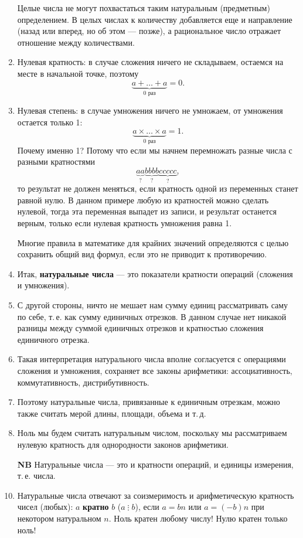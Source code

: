 \begin{enumerate}
Целые числа не могут похвастаться таким натуральным (предметным) определением. В целых числах к количеству добавляется еще и направление (назад или вперед, но об этом --- позже), а рациональное число отражает отношение между количествами.

\item Нулевая кратность: в случае сложения ничего не складываем, остаемся на месте в начальной точке, поэтому
$$
\underbrace{a+\dots+a}_{0\mbox{ раз}}=0.
$$
\item Нулевая степень: в случае умножения ничего не умножаем, от умножения остается только 1:
$$
\underbrace{a\times\dots\times a}_{0\mbox{ раз}}=1.
$$
Почему именно 1? Потому что если мы начнем перемножать разные числа с разными кратностями
$$
\underbrace{aa}_{?}\underbrace{bbbb}_{?}\underbrace{ccccc}_{?},
$$
то результат не должен меняться, если кратность одной из переменных станет равной нулю. В данном примере любую из кратностей можно сделать нулевой, тогда эта переменная выпадет из записи, и результат останется верным, только если нулевая кратность умножения равна 1.

Многие правила в математике для крайних значений определяются с целью сохранить общий вид формул, если это не приводит к противоречию.
\item Итак, \textbf{натуральные числа} --- это показатели кратности операций (сложения и умножения).
\item С другой стороны, ничто не мешает нам сумму единиц рассматривать саму по себе, т.\,е. как сумму единичных отрезков. В данном случае нет никакой разницы между суммой единичных отрезков и кратностью сложения единичного отрезка.
\item Такая интерпретация натурального числа вполне согласуется с операциями сложения и умножения, сохраняет все законы арифметики: ассоциативность, коммутативность, дистрибутивность.
\item Поэтому натуральные числа, привязанные к единичным отрезкам, можно также считать мерой длины, площади, объема и т.\,д.
\item Ноль мы будем считать натуральным числом, поскольку мы рассматриваем нулевую кратность для однородности законов арифметики.
\item[\bf NB] Натуральные числа --- это и кратности операций, и единицы измерения, т.\,е. числа.
\item Натуральные числа отвечают за соизмеримость и арифметическую кратность чисел (любых): $a$ \textbf{кратно} $b$ ($a\mathop{\vdots} b$), если $a=bn$ или $a=(-b)n$ при некотором натуральном $n$. Ноль кратен любому числу! Нулю кратен только ноль!


\end{enumerate}
